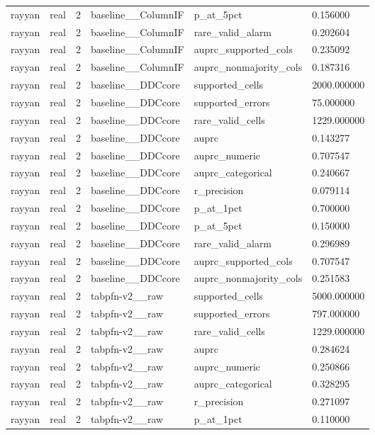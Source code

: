 \begin{tabular}{llllll}
rayyan & real & 2 & baseline\_\_ColumnIF & p\_at\_5pct & 0.156000 \\
rayyan & real & 2 & baseline\_\_ColumnIF & rare\_valid\_alarm & 0.202604 \\
rayyan & real & 2 & baseline\_\_ColumnIF & auprc\_supported\_cols & 0.235092 \\
rayyan & real & 2 & baseline\_\_ColumnIF & auprc\_nonmajority\_cols & 0.187316 \\
rayyan & real & 2 & baseline\_\_DDCcore & supported\_cells & 2000.000000 \\
rayyan & real & 2 & baseline\_\_DDCcore & supported\_errors & 75.000000 \\
rayyan & real & 2 & baseline\_\_DDCcore & rare\_valid\_cells & 1229.000000 \\
rayyan & real & 2 & baseline\_\_DDCcore & auprc & 0.143277 \\
rayyan & real & 2 & baseline\_\_DDCcore & auprc\_numeric & 0.707547 \\
rayyan & real & 2 & baseline\_\_DDCcore & auprc\_categorical & 0.240667 \\
rayyan & real & 2 & baseline\_\_DDCcore & r\_precision & 0.079114 \\
rayyan & real & 2 & baseline\_\_DDCcore & p\_at\_1pct & 0.700000 \\
rayyan & real & 2 & baseline\_\_DDCcore & p\_at\_5pct & 0.150000 \\
rayyan & real & 2 & baseline\_\_DDCcore & rare\_valid\_alarm & 0.296989 \\
rayyan & real & 2 & baseline\_\_DDCcore & auprc\_supported\_cols & 0.707547 \\
rayyan & real & 2 & baseline\_\_DDCcore & auprc\_nonmajority\_cols & 0.251583 \\
rayyan & real & 2 & tabpfn-v2\_\_raw & supported\_cells & 5000.000000 \\
rayyan & real & 2 & tabpfn-v2\_\_raw & supported\_errors & 797.000000 \\
rayyan & real & 2 & tabpfn-v2\_\_raw & rare\_valid\_cells & 1229.000000 \\
rayyan & real & 2 & tabpfn-v2\_\_raw & auprc & 0.284624 \\
rayyan & real & 2 & tabpfn-v2\_\_raw & auprc\_numeric & 0.250866 \\
rayyan & real & 2 & tabpfn-v2\_\_raw & auprc\_categorical & 0.328295 \\
rayyan & real & 2 & tabpfn-v2\_\_raw & r\_precision & 0.271097 \\
rayyan & real & 2 & tabpfn-v2\_\_raw & p\_at\_1pct & 0.110000 \\

\end{tabular}
